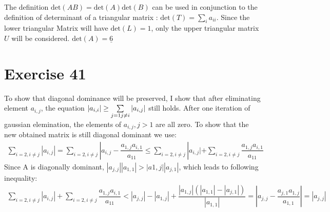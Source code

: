 The definition $\text{det}(AB) = \text{det}(A) \text{det}(B)$ can be used in conjunction to the definition of determinant of a triangular matrix : $\text{det}(T) = \sum\limits_i a_{ii}$.
Since the lower triangular Matrix will have $\text{det}(L) = 1$, only the upper triangular matrix $U$ will be considered. 
$\text{det}(A) = \underline{6}$

\section{Exercise 41}
To show that diagonal dominance will be preserved, I show that after eliminating element $a_{i,j}$, the equation $ |a_{i,i}| \geq \sum\limits_{j = 1 \\ j \neq i} |a_{i,j}| $ still holds. 
After one iteration of gaussian elemination, the elements of $a_{i,j} , j > 1 $ are all zero. To show that the new obtained matrix is still diagonal dominant we use:
\begin{gather*} 
\sum\limits_{ i = 2 , i \neq j } | a_{i,j} | = \sum\limits_{ i = 2 , i \neq j } | a_{i,j} - \dfrac{a_{1,j}a_{i,1}}{a_{11}} \leq  \sum\limits_{ i = 2 , i \neq j } | a_{i,j} | + \sum\limits_{ i = 2 , i \neq j }  \dfrac{a_{1,j}a_{i,1}}{a_{11}}
\end{gather*}
Since A is diagonally dominant, $|a_{j,j}| | a_{1,1}| > |a{1,j}||a_{j,1}|$, which leads to following inequality:
\begin{gather*}
 \sum\limits_{ i = 2 , i \neq j } | a_{i,j} | + \sum\limits_{ i = 2 , i \neq j }  \dfrac{a_{1,j}a_{i,1}}{a_{11}} < |a_{j,j}| - | a_{1,j} | + \dfrac{|a_{1,j}|(|a_{1,1}| - |a_{j,1}|) }{|a_{1,1}|} = 
|a_{j,j} - \dfrac{a_{j,1} a_{1,j}}{a_{1,1}}| = |a_{j,j} |
\end{gather*}


